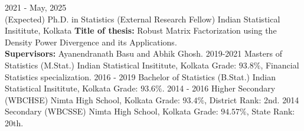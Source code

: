 \documentclass[9pt]{developercv} %
\begin{document}
\begin{entrylist}
    \entry
    {2021 - May, 2025\\(Expected)}
    {Ph.D. in Statistics (External Research Fellow)}
    {Indian Statistical Insititute, Kolkata}
    {\textbf{Title of thesis:} Robust Matrix Factorization using the Density Power Divergence and its Applications. \\
    \textbf{Supervisors:} Ayanendranath Basu and Abhik Ghosh.}
    \entry
    {2019-2021}
    {Masters of Statistics (M.Stat.)}
    {Indian Statistical Insititute, Kolkata}
    {Grade: $93.8\%$, Financial Statistics specialization.}
    \entry
    {2016 - 2019}
    {Bachelor of Statistics (B.Stat.)}
    {Indian Statistical Insititute, Kolkata}
    {Grade: $93.6\%$.}
    \entry
    {2014 - 2016}
    {Higher Secondary (WBCHSE)}
    {Nimta High School, Kolkata}
    {Grade: $93.4\%$, District Rank: 2nd.}
    \entry
    {2014}
    {Secondary (WBCSSE)}
    {Nimta High School, Kolkata}
    {Grade: $94.57\%$, State Rank: 20th.}
\end{entrylist}
\end{document}
